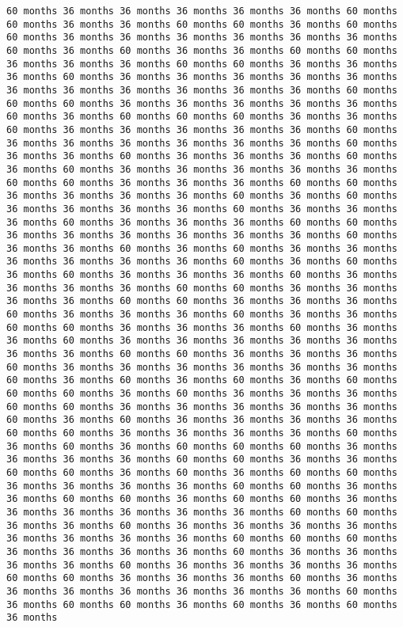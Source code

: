 \documentclass[11pt]{article}
\begin{document}
\begin{Verbatim}[commandchars=\\\{\}, frame=single, framerule=2mm, rulecolor=\color{outerrorbackground}]
60 months 36 months 36 months 36 months 36 months 36 months 60 months 60 months 36 months 36 months 60 months 60 months 36 months 60 months 60 months 36 months 36 months 36 months 36 months 36 months 36 months 60 months 36 months 60 months 36 months 36 months 60 months 60 months 36 months 36 months 36 months 60 months 60 months 36 months 36 months 36 months 60 months 36 months 36 months 36 months 36 months 36 months 36 months 36 months 36 months 36 months 36 months 36 months 60 months 60 months 60 months 36 months 36 months 36 months 36 months 36 months 60 months 36 months 60 months 60 months 60 months 36 months 36 months 60 months 36 months 36 months 36 months 36 months 36 months 60 months 36 months 36 months 36 months 36 months 36 months 36 months 60 months 36 months 36 months 60 months 36 months 36 months 36 months 60 months 36 months 60 months 36 months 36 months 36 months 36 months 36 months 60 months 60 months 36 months 36 months 36 months 60 months 60 months 36 months 36 months 36 months 36 months 60 months 36 months 60 months 36 months 36 months 36 months 36 months 60 months 36 months 36 months 36 months 60 months 36 months 36 months 36 months 60 months 60 months 36 months 36 months 36 months 36 months 36 months 36 months 60 months 36 months 36 months 60 months 36 months 60 months 36 months 36 months 36 months 36 months 36 months 36 months 60 months 36 months 60 months 36 months 60 months 36 months 36 months 36 months 60 months 36 months 36 months 36 months 36 months 60 months 60 months 36 months 36 months 36 months 36 months 60 months 60 months 36 months 36 months 36 months 60 months 36 months 36 months 36 months 60 months 36 months 36 months 60 months 60 months 36 months 36 months 36 months 60 months 36 months 36 months 60 months 36 months 36 months 36 months 36 months 36 months 36 months 36 months 60 months 60 months 36 months 36 months 36 months 60 months 36 months 36 months 36 months 36 months 36 months 36 months 60 months 36 months 60 months 36 months 60 months 36 months 60 months 60 months 60 months 36 months 60 months 36 months 36 months 36 months 60 months 60 months 36 months 36 months 36 months 36 months 36 months 60 months 36 months 60 months 36 months 36 months 36 months 36 months 60 months 60 months 36 months 36 months 36 months 36 months 60 months 36 months 60 months 36 months 60 months 60 months 60 months 36 months 36 months 36 months 36 months 60 months 60 months 36 months 36 months 60 months 60 months 36 months 60 months 36 months 60 months 60 months 36 months 36 months 36 months 36 months 60 months 60 months 36 months 36 months 60 months 60 months 36 months 60 months 60 months 36 months 36 months 36 months 36 months 36 months 36 months 60 months 60 months 36 months 36 months 60 months 36 months 36 months 36 months 36 months 36 months 36 months 36 months 36 months 60 months 60 months 60 months 36 months 36 months 36 months 36 months 60 months 36 months 36 months 36 months 36 months 60 months 36 months 36 months 36 months 36 months 60 months 60 months 36 months 36 months 36 months 60 months 36 months 36 months 36 months 36 months 36 months 36 months 36 months 60 months 36 months 60 months 60 months 36 months 60 months 36 months 60 months 36 months 
\end{Verbatim}
\end{document}
